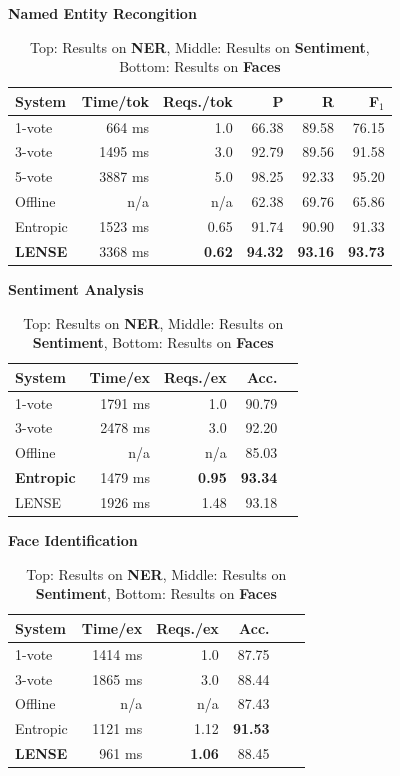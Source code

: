 \begin{table}[s]
{\bf Named Entity Recongition} \\
\begin{tabular}{l r r r r r}
    \textbf{System} & \textbf{Time/tok} & \textbf{Reqs./tok} & \textbf{P} & \textbf{R} & \textbf{F$_1$} \\ \hline
    1-vote & 664 ms & 1.0 & 66.38 & 89.58 & 76.15 \\ %
    3-vote & 1495 ms & 3.0 & 92.79 & 89.56 & 91.58 \\ %
    5-vote & 3887 ms & 5.0 & 98.25 & 92.33 & 95.20 \\ %
    Offline & n/a & n/a & 62.38 & 69.76 & 65.86 \\ %
    Entropic & 1523 ms & 0.65 & 91.74 & 90.90 & 91.33 \\ %
    \textbf{LENSE} & 3368 ms & \textbf{0.62} & \textbf{94.32} & \textbf{93.16} & \textbf{93.73} \\ %
\end{tabular}

{\bf Sentiment Analysis}\\
\begin{tabular}{l  r  r  r  r}
    \textbf{System} & \textbf{Time/ex} & \textbf{Reqs./ex} & \textbf{Acc.} \\ \hline
    1-vote & 1791 ms & 1.0 & 90.79 \\ %
    3-vote & 2478 ms & 3.0 & 92.20 \\ %
    Offline & n/a & n/a & 85.03 \\ %
    \textbf{Entropic} & 1479 ms & \textbf{0.95} & \textbf{93.34} \\ %
    LENSE & 1926 ms & 1.48 & 93.18 \\ %
\end{tabular}

{\bf Face Identification}\\
\begin{tabular}{l  r  r  r  r  r}
    \textbf{System} & \textbf{Time/ex} & \textbf{Reqs./ex} & \textbf{Acc.} \\ \hline
    1-vote & 1414 ms & 1.0 & 87.75 \\ %
    3-vote & 1865 ms & 3.0 & 88.44 \\ %
    Offline & n/a & n/a & 87.43 \\    %
    Entropic & 1121 ms & 1.12 & \textbf{91.53} \\ %
    \textbf{LENSE} & 961 ms & \textbf{1.06} & 88.45 \\   %
\end{tabular}
  \caption{Top: Results on {\bf NER}, Middle: Results on {\bf Sentiment}, Bottom: Results on {\bf Faces}}
  \label{tbl:results}
\end{table}
